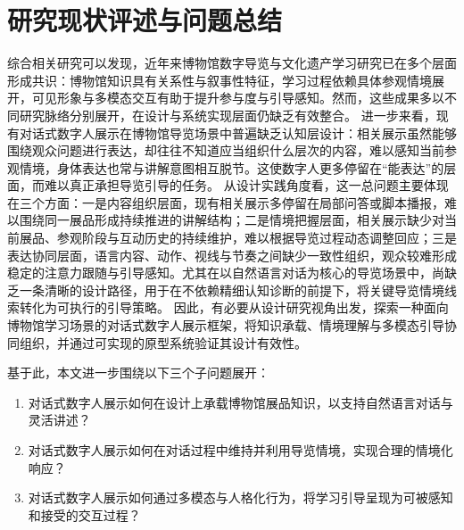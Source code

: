 \section{研究现状评述与问题总结}
综合相关研究可以发现，近年来博物馆数字导览与文化遗产学习研究已在多个层面形成共识：博物馆知识具有关系性与叙事性特征，学习过程依赖具体参观情境展开，可见形象与多模态交互有助于提升参与度与引导感知。然而，这些成果多以不同研究脉络分别展开，在设计与系统实现层面仍缺乏有效整合。
进一步来看，现有对话式数字人展示在博物馆导览场景中普遍缺乏认知层设计：相关展示虽然能够围绕观众问题进行表达，却往往不知道应当组织什么层次的内容，难以感知当前参观情境，身体表达也常与讲解意图相互脱节。这使数字人更多停留在“能表达”的层面，而难以真正承担导览引导的任务。
从设计实践角度看，这一总问题主要体现在三个方面：一是内容组织层面，现有相关展示多停留在局部问答或脚本播报，难以围绕同一展品形成持续推进的讲解结构；二是情境把握层面，相关展示缺少对当前展品、参观阶段与互动历史的持续维护，难以根据导览过程动态调整回应；三是表达协同层面，语言内容、动作、视线与节奏之间缺少一致性组织，观众较难形成稳定的注意力跟随与引导感知。尤其在以自然语言对话为核心的导览场景中，尚缺乏一条清晰的设计路径，用于在不依赖精细认知诊断的前提下，将关键导览情境线索转化为可执行的引导策略。
因此，有必要从设计研究视角出发，探索一种面向博物馆学习场景的对话式数字人展示框架，将知识承载、情境理解与多模态引导协同组织，并通过可实现的原型系统验证其设计有效性。

基于此，本文进一步围绕以下三个子问题展开：
\begin{enumerate}[label=（\arabic*）]
\item 对话式数字人展示如何在设计上承载博物馆展品知识，以支持自然语言对话与灵活讲述？
\item 对话式数字人展示如何在对话过程中维持并利用导览情境，实现合理的情境化响应？
\item 对话式数字人展示如何通过多模态与人格化行为，将学习引导呈现为可被感知和接受的交互过程？
\end{enumerate}
